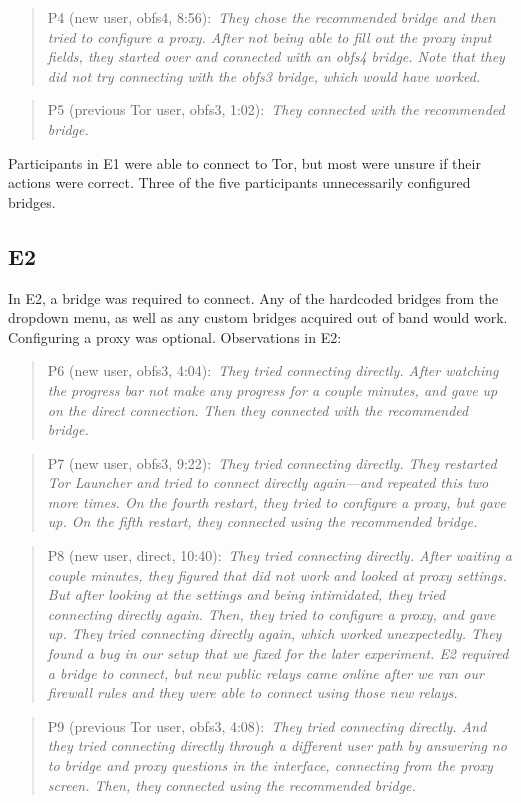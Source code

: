 \documentclass[USenglish,oneside,twocolumn]{article}
\newcommand{\pquote}[2]{
\begin{quotation}
\noindent #1:~\textit{#2}
\end{quotation}
}
\begin{document}
\pquote{P4 (new user, obfs4, 8:56)}{They chose the recommended bridge and then tried to configure a proxy. After not being able to fill out the proxy input fields, they started over and connected with an obfs4 bridge. Note that they did not try connecting with the obfs3 bridge, which would have worked.}

\pquote{P5 (previous Tor user, obfs3, 1:02)}{They connected with the recommended bridge.}

Participants in E1 were able to connect to Tor, but most were unsure if their actions were correct. Three of the five participants unnecessarily configured bridges. 

\subsection{E2} 
In E2, a bridge was required to connect. Any of the hardcoded bridges from the dropdown menu, as well as any custom bridges acquired out of band would work. Configuring a proxy was optional.
Observations in E2: 

\pquote{P6 (new user, obfs3, 4:04)}{They tried connecting directly. After watching the progress bar not make any progress for a couple minutes, and gave up on the direct connection. Then they connected with the recommended bridge.}

\pquote{P7 (new user, obfs3, 9:22)}{They tried connecting directly. They restarted Tor Launcher and tried to connect directly again---and repeated this two more times. On the fourth restart, they tried to configure a proxy, but gave up. On the fifth restart, they connected using the recommended bridge.}

\pquote{P8 (new user, direct, 10:40)}{They tried connecting directly. After waiting a couple minutes, they figured that did not work and looked at proxy settings. But after looking at the settings and being intimidated, they tried connecting directly again. Then, they tried to configure a proxy, and gave up. They tried connecting directly again, which worked unexpectedly. They found a bug in our setup that we fixed for the later experiment. E2 required a bridge to connect, but new public relays came online after we ran our firewall rules and they were able to connect using those new relays. }

\pquote{P9 (previous Tor user, obfs3, 4:08)}{They tried connecting directly. And they tried connecting directly through a different user path by answering no to bridge and proxy questions in the interface, connecting from the proxy screen. Then, they connected using the recommended bridge.}
\end{document}
